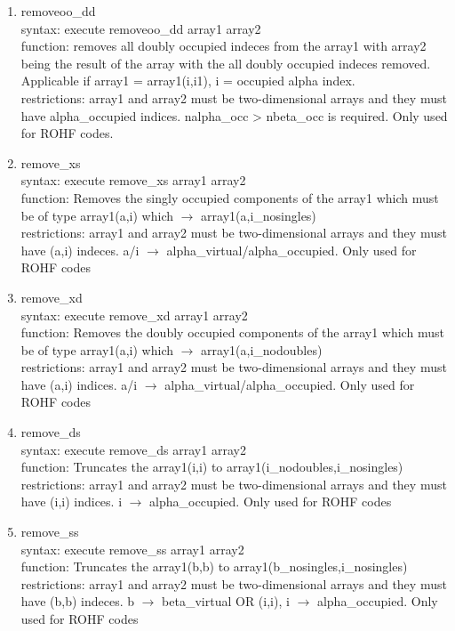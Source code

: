\documentclass[12pt]{article}
\begin{document}
\begin{enumerate}
\item removeoo\_dd\\ 
syntax: execute removeoo\_dd array1 array2\\ 
function: removes all doubly occupied indeces from the array1 with array2 being the result 
of the array with the all doubly occupied indeces removed. Applicable if 
array1 = array1(i,i1), i = occupied alpha index.\\ 
restrictions: array1 and array2 must be two-dimensional arrays and they must have 
alpha\_occupied indices. nalpha\_occ > nbeta\_occ is required. Only used for ROHF codes.

\item remove\_xs\\ 
syntax: execute remove\_xs array1 array2\\ 
function: Removes the singly occupied components of the array1 which must be of type 
array1(a,i) which $\rightarrow$ array1(a,i\_nosingles)\\ 
restrictions: array1 and array2 must be two-dimensional arrays and they must have (a,i) 
indeces. a/i $\rightarrow$  alpha\_virtual/alpha\_occupied. Only used for ROHF codes

\item remove\_xd\\ 
syntax: execute remove\_xd array1 array2\\ 
function: Removes the doubly occupied components of the array1 which must be of type 
array1(a,i) which $\rightarrow$  array1(a,i\_nodoubles)\\ 
restrictions: array1 and array2 must be two-dimensional arrays and they must have (a,i) 
indices. a/i $\rightarrow$ alpha\_virtual/alpha\_occupied. Only used for ROHF codes

\item remove\_ds\\ 
syntax: execute remove\_ds array1 array2\\ 
function: Truncates the array1(i,i) to array1(i\_nodoubles,i\_nosingles)\\ 
restrictions: array1 and array2 must be two-dimensional arrays and they must have (i,i) 
indices. i $\rightarrow$ alpha\_occupied. Only used for ROHF codes

\item remove\_ss\\ 
syntax: execute remove\_ss array1 array2\\ 
function: Truncates the array1(b,b) to array1(b\_nosingles,i\_nosingles)\\
restrictions: array1 and array2 must be two-dimensional arrays and they must have (b,b) 
indeces. b $\rightarrow$  beta\_virtual OR (i,i), i $\rightarrow$  alpha\_occupied. 
Only used for ROHF codes


\end{enumerate}
\end{document}
